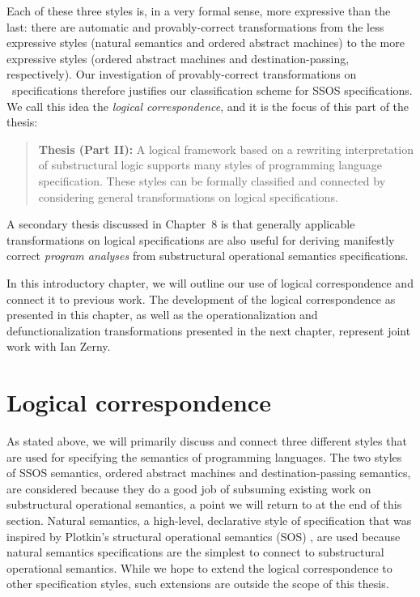 \noindent
Each of these three styles is, in a very formal sense, more
expressive than the last: there are automatic and
provably-correct transformations from the less expressive styles
(natural semantics and ordered abstract machines) to the more
expressive styles (ordered abstract machines and destination-passing,
respectively).  Our investigation of provably-correct transformations
on \sls~specifications therefore justifies our classification scheme
for SSOS specifications. We call this idea the {\it logical
  correspondence}, and it is the focus of this part of the thesis:

\smallskip
\begin{quote} 
  {\bf Thesis (Part II):} A logical framework based on a rewriting
  interpretation of substructural logic supports many styles of
  programming language specification. These styles can be formally
  classified and connected by considering general transformations on
  logical specifications.
\end{quote} 

\noindent
A secondary thesis discussed in Chapter~8 is that generally
applicable transformations on logical specifications are also useful
for deriving manifestly correct {\it program analyses} from
substructural operational semantics specifications.


In this introductory chapter, we will outline our use of logical
correspondence and connect it to previous work. The development of the
logical correspondence as presented in this chapter, as well as the
operationalization and defunctionalization transformations presented
in the next chapter, represent joint work with Ian Zerny.



\section{Logical correspondence}
\label{section-introtologicalcorrespondence}

As stated above, we will primarily discuss and connect three different
styles that are used for specifying the semantics of programming
languages. The two styles of SSOS semantics, ordered abstract machines
and destination-passing semantics, are considered because they do a
good job of subsuming existing work on substructural operational
semantics, a point we will return to at the end of this
section. Natural semantics, a high-level, declarative style of
specification that was inspired by Plotkin's structural operational
semantics (SOS) \cite{plotkin04structural,kahn87natural}, are used
because natural semantics specifications are the simplest to connect
to substructural operational semantics. While we hope to extend the
logical correspondence to other specification styles, such extensions
are outside the scope of this thesis.

